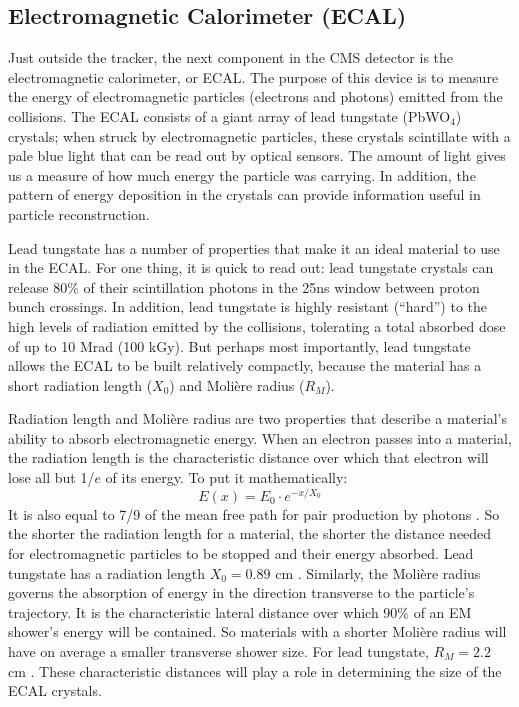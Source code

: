 \subsection{Electromagnetic Calorimeter (ECAL)}
\label{ssec:cms:components:ecal}

Just outside the tracker, the next component in the CMS
detector is the electromagnetic calorimeter, or ECAL. The purpose of
this device is to measure the energy of electromagnetic particles
(electrons and photons) emitted from the collisions. The ECAL consists
of a giant array of lead tungstate (PbWO$_4$) crystals; when struck by
electromagnetic particles, these crystals scintillate with a
pale blue light that can be read out by optical sensors. The amount of
light gives us a measure of how much energy the particle was
carrying. In addition, the pattern of energy deposition in the
crystals can provide information useful in particle
reconstruction.

Lead tungstate has a number of properties that make it an ideal
material to use in the ECAL. For one thing, it is quick to read
out: lead tungstate crystals can release 80\% of their scintillation
photons in the 25ns window between proton bunch crossings. In
addition, lead tungstate is highly resistant (``hard'') to the high
levels of radiation emitted by the collisions, tolerating a total
absorbed dose of up to 10 Mrad (100 kGy). But perhaps most importantly,
lead tungstate allows the ECAL to be built relatively compactly,
because the material has a short radiation length ($X_0$) and
Moli\`{e}re radius ($R_M$).

Radiation length and Moli\`{e}re radius are two properties that
describe a material's ability to absorb electromagnetic energy. When
an electron passes into a material, the radiation length is the
characteristic distance over which that electron will lose all
but 1/$e$ of its energy. To put it mathematically:
\begin{equation}
\label{eq:cms:ecal:radlength}
E(x) = E_0 \cdot e^{-x/X_0}
\end{equation}
It is also equal to 7/9 of the mean free path for pair production by
photons \cite{pdg}. So the shorter the radiation length for a
material, the shorter the distance needed for electromagnetic
particles to be stopped and their energy absorbed. Lead tungstate has
a radiation length $X_0 = 0.89$ cm \cite{tdr}. Similarly, the
Moli\`{e}re radius governs the absorption of energy in the direction
transverse to the particle's trajectory. It is the characteristic
lateral distance over which 90\% of an EM shower's energy will be
contained. So materials with a shorter Moli\`{e}re radius will have on
average a smaller transverse shower size. For lead tungstate, $R_M =
2.2$ cm \cite{tdr}. These characteristic distances will play a role in
determining the size of the ECAL crystals.

